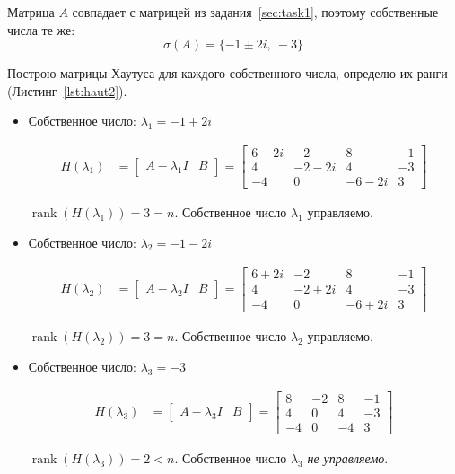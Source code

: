 \documentclass[a4paper,12pt]{article}
\begin{document}
	Матрица $A$ совпадает с матрицей из задания~\ref{sec:task1}, поэтому собственные числа 
	те же:
	\[
	\sigma(A) = \{-1 \pm 2i, \ -3\}
	\]
	
	Построю матрицы Хаутуса для каждого собственного числа, определю их ранги (Листинг~\ref{lst:haut2}).
	
	\begin{itemize}
		\item Собственное число: $\lambda_1 = -1 + 2i$
		
		\begin{align*}
			H(\lambda_1) &= \begin{bmatrix} A - \lambda_1 I & B \end{bmatrix} =
			\begin{bmatrix}
				6-2i & -2 & 8 & -1 \\
				4 & -2-2i & 4 & -3 \\
				-4 & 0 & -6-2i & 3
			\end{bmatrix}
		\end{align*}
		
		$\operatorname{rank}(H(\lambda_1)) = 3 = n$. Собственное число $\lambda_1$ управляемо.
		
		\item Собственное число: $\lambda_2 = -1 - 2i$
		
		\begin{align*}
			H(\lambda_2) &= \begin{bmatrix} A - \lambda_2 I & B \end{bmatrix} =
			\begin{bmatrix}
				6+2i & -2 & 8 & -1 \\
				4 & -2+2i & 4 & -3 \\
				-4 & 0 & -6+2i & 3
			\end{bmatrix}
		\end{align*}
		
		$\operatorname{rank}(H(\lambda_2)) = 3 = n$. Собственное число $\lambda_2$ управляемо.
		
		\item Собственное число: $\lambda_3 = -3$
		
		\begin{align*}
			H(\lambda_3) &= \begin{bmatrix} A - \lambda_3 I & B \end{bmatrix} =
			\begin{bmatrix}
				8 & -2 & 8 & -1 \\
				4 & 0 & 4 & -3 \\
				-4 & 0 & -4 & 3
			\end{bmatrix}
		\end{align*}
		
		$\operatorname{rank}(H(\lambda_3)) = 2 < n$. Собственное число $\lambda_3$ \textit{не управляемо}.
	\end{itemize}
	
\end{document}
